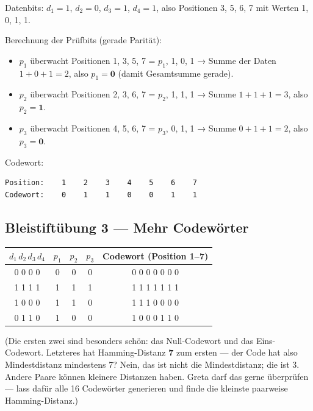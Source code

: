Datenbits: $d_1 = 1$, $d_2 = 0$, $d_3 = 1$, $d_4 = 1$, also Positionen
3, 5, 6, 7 mit Werten 1, 0, 1, 1.

Berechnung der Prüfbits (gerade Parität):

\begin{itemize}
\item $p_1$ überwacht Positionen 1, 3, 5, 7 = $p_1$, 1, 0, 1 → Summe
  der Daten $1+0+1 = 2$, also $p_1 = \mathbf{0}$ (damit Gesamtsumme
  gerade).
\item $p_2$ überwacht Positionen 2, 3, 6, 7 = $p_2$, 1, 1, 1 → Summe
  $1+1+1 = 3$, also $p_2 = \mathbf{1}$.
\item $p_3$ überwacht Positionen 4, 5, 6, 7 = $p_3$, 0, 1, 1 → Summe
  $0+1+1 = 2$, also $p_3 = \mathbf{0}$.
\end{itemize}

Codewort:

\begin{verbatim}
Position:    1    2    3    4    5    6    7
Codewort:    0    1    1    0    0    1    1
\end{verbatim}

\subsection*{Bleistiftübung 3 — Mehr Codewörter}

\begin{center}
\begin{tabular}{ccccc}
  \toprule
  $d_1\, d_2\, d_3\, d_4$ & $p_1$ & $p_2$ & $p_3$ & Codewort (Position 1–7) \\
  \midrule
  0 0 0 0 & 0 & 0 & 0 & 0 0 0 0 0 0 0 \\
  1 1 1 1 & 1 & 1 & 1 & 1 1 1 1 1 1 1 \\
  1 0 0 0 & 1 & 1 & 0 & 1 1 1 0 0 0 0 \\
  0 1 1 0 & 1 & 0 & 0 & 1 0 0 0 1 1 0 \\
  \bottomrule
\end{tabular}
\end{center}

(Die ersten zwei sind besonders schön: das Null-Codewort und das
Eins-Codewort. Letzteres hat Hamming-Distanz \textbf{7} zum ersten —
der Code hat also Mindestdistanz mindestens 7? Nein, das ist nicht die
Mindestdistanz; die ist 3. Andere Paare können kleinere Distanzen
haben. Greta darf das gerne überprüfen — lass dafür alle 16 Codewörter
generieren und finde die kleinste paarweise Hamming-Distanz.)

